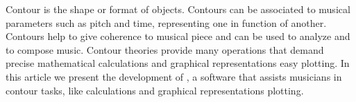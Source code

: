 Contour is the shape or format of objects. Contours can be associated
to musical parameters such as pitch and time, representing one in
function of another. Contours help to give coherence to musical piece
and can be used to analyze and to compose music. Contour theories
provide many operations that demand precise mathematical calculations
and graphical representations easy plotting. In this article we
present the  development
of \goiaba{}, a software that assists musicians in contour tasks, like
calculations and graphical representations plotting.
